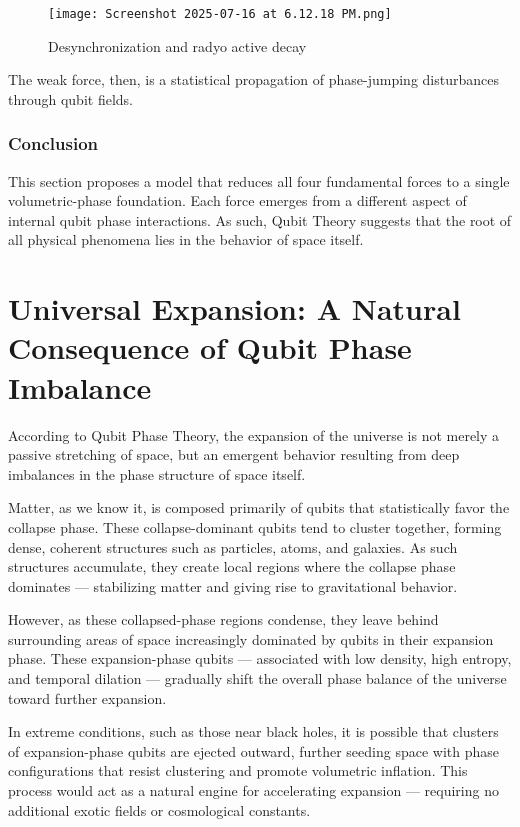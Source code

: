 \documentclass[12pt]{report} %
\begin{document}
\begin{figure}[H]
    \centering
    \texttt{[image: Screenshot 2025-07-16 at 6.12.18 PM.png]}
    \caption{Desynchronization and radyo active decay }
    \label{fig:enter-label}
\end{figure}

The weak force, then, is a statistical propagation of phase-jumping disturbances through qubit fields.

\subsection*{Conclusion}

This section proposes a model that reduces all four fundamental forces to a single volumetric-phase foundation. Each force emerges from a different aspect of internal qubit phase interactions. As such, Qubit Theory suggests that the root of all physical phenomena lies in the behavior of space itself.

\chapter{Universal Expansion: A Natural Consequence of Qubit Phase Imbalance}

According to Qubit Phase Theory, the expansion of the universe is not merely a passive stretching of space, but an emergent behavior resulting from deep imbalances in the phase structure of space itself.

Matter, as we know it, is composed primarily of qubits that statistically favor the collapse phase. These collapse-dominant qubits tend to cluster together, forming dense, coherent structures such as particles, atoms, and galaxies. As such structures accumulate, they create local regions where the collapse phase dominates — stabilizing matter and giving rise to gravitational behavior.

However, as these collapsed-phase regions condense, they leave behind surrounding areas of space increasingly dominated by qubits in their expansion phase. These expansion-phase qubits — associated with low density, high entropy, and temporal dilation — gradually shift the overall phase balance of the universe toward further expansion.

In extreme conditions, such as those near black holes, it is possible that clusters of expansion-phase qubits are ejected outward, further seeding space with phase configurations that resist clustering and promote volumetric inflation. This process would act as a natural engine for accelerating expansion — requiring no additional exotic fields or cosmological constants.
\end{document}
